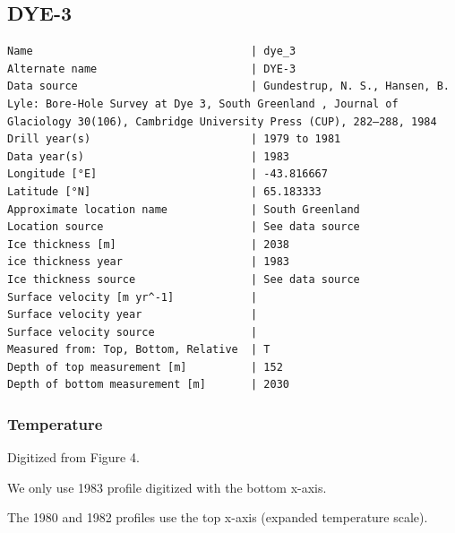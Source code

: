 \documentclass[article,a4paper,times,11pt,twoside]{article}
\begin{document}
\subsection{DYE-3}
\label{sec:org2c31205}
\begin{verbatim}
Name                                  | dye_3
Alternate name                        | DYE-3
Data source                           | Gundestrup, N. S., Hansen, B. Lyle: Bore-Hole Survey at Dye 3, South Greenland , Journal of Glaciology 30(106), Cambridge University Press (CUP), 282–288, 1984 
Drill year(s)                         | 1979 to 1981
Data year(s)                          | 1983
Longitude [°E]                        | -43.816667
Latitude [°N]                         | 65.183333
Approximate location name             | South Greenland
Location source                       | See data source
Ice thickness [m]                     | 2038
ice thickness year                    | 1983
Ice thickness source                  | See data source
Surface velocity [m yr^-1]            | 
Surface velocity year                 | 
Surface velocity source               | 
Measured from: Top, Bottom, Relative  | T
Depth of top measurement [m]          | 152
Depth of bottom measurement [m]       | 2030
\end{verbatim}

\subsubsection{Temperature}
\label{sec:org7426ac9}

Digitized from \textcite{gundestrup_1984} Figure 4.

We only use 1983 profile digitized with the bottom x-axis.

The 1980 and 1982 profiles use the top x-axis (expanded temperature scale).
\end{document}
